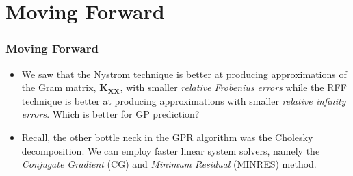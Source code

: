 \documentclass[9pt,hyperref={pdfpagelabels=false},xcolor=table]{beamer}
\begin{document}
\section{Moving Forward}

\begin{frame}
    \frametitle{Moving Forward}
    \begin{itemize}
        \item We saw that the Nystrom technique is better at producing approximations of the Gram matrix, $\bm{K}_{\bm{XX}}$, with smaller {\it relative Frobenius errors} while the RFF technique is better at producing approximations with smaller {\it relative infinity errors}. Which is better for GP prediction?
        \item Recall, the other bottle neck in the GPR algorithm was the Cholesky decomposition. We can employ faster linear system solvers, namely the {\it Conjugate Gradient} (CG) and {\it Minimum Residual} (MINRES) method.
    \end{itemize}
\end{frame}
\end{document}
